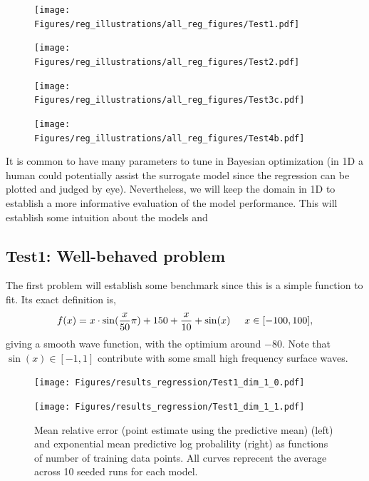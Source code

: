 \begin{figure}[h]
  \centering
  \begin{minipage}[b]{0.24\textwidth}
   \texttt{[image: Figures/reg\_illustrations/all\_reg\_figures/Test1.pdf]}
  \end{minipage}
  \hfill
  \begin{minipage}[b]{0.24\textwidth}
    \texttt{[image: Figures/reg\_illustrations/all\_reg\_figures/Test2.pdf]}
   \end{minipage}
   \hfill
   \begin{minipage}[b]{0.24\textwidth}
    \texttt{[image: Figures/reg\_illustrations/all\_reg\_figures/Test3c.pdf]}
   \end{minipage}
   \hfill
   \begin{minipage}[b]{0.24\textwidth}
     \texttt{[image: Figures/reg\_illustrations/all\_reg\_figures/Test4b.pdf]}
    \end{minipage}

  \label{TEST_problems}
\end{figure}


It is common to have many parameters to tune in Bayesian optimization (in 1D a human could
potentially assist the surrogate model since the regression can be plotted and judged by eye).
Nevertheless, we will keep the domain in 1D to establish  
a more informative evaluation of the model performance.
This will establish some intuition about the models and 


\subsection*{Test1: Well-behaved problem}
The first problem will establish some benchmark since this is a simple function to fit. Its exact definition is,
$$f(x) = x\cdot \sin(\frac{x}{50} \pi) + 150 + \frac{x}{10} + \sin(x) \hspace{0.5cm} x \in [-100,100],$$
giving a smooth wave function, with the optimium around $-80$. Note that $\sin(x)\in [-1,1]$ contribute with
some small high frequency surface waves. 

\begin{figure}[H]
  \centering
  \begin{minipage}[b]{0.49\textwidth}
   \texttt{[image: Figures/results\_regression/Test1\_dim\_1\_0.pdf]}
  \end{minipage}
  \hfill
  \begin{minipage}[b]{0.49\textwidth}
    \texttt{[image: Figures/results\_regression/Test1\_dim\_1\_1.pdf]}
   \end{minipage}
  \caption{Mean relative error (point estimate using the predictive mean) (left) and exponential mean predictive log probalility (right) as
  functions of number of training data points. All curves reprecent the average across 10 seeded runs for each
  model.}
  \label{Test1_reg_plot}
\end{figure}

